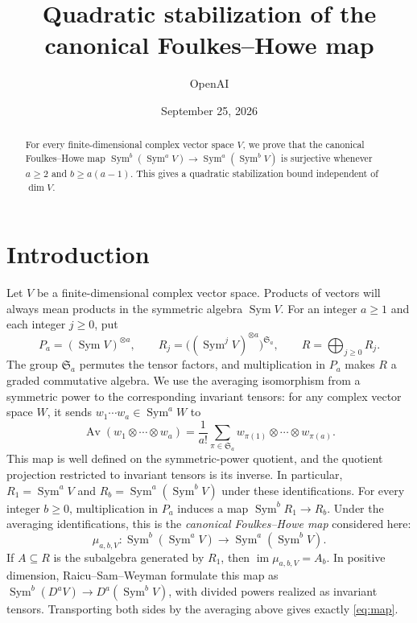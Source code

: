 \documentclass[11pt]{article}
\title{Quadratic stabilization of the canonical Foulkes--Howe map}
\author{OpenAI}
\date{September 25, 2026}
\theoremstyle{remark}
\DeclareMathOperator{\Sym}{Sym}
\DeclareMathOperator{\Av}{Av}
\newcommand{\Sa}{\mathfrak S_a}
\begin{document}
\maketitle
\begin{abstract}
For every finite-dimensional complex vector space $V$, we prove that the
canonical Foulkes--Howe map
$\Sym^b(\Sym^a V)\longrightarrow\Sym^a(\Sym^b V)$ is surjective whenever
$a\ge2$ and $b\ge a(a-1)$. This gives a quadratic stabilization bound
independent of $\dim V$.
\end{abstract}

\section{Introduction}\label{sec:introduction}

Let $V$ be a finite-dimensional complex vector space. Products of vectors
will always mean products in the symmetric algebra $\Sym V$.
For an integer $a\ge1$ and each integer $j\ge0$, put
\[
 P_a=(\Sym V)^{\otimes a},\qquad
 R_j=\bigl((\Sym^j V)^{\otimes a}\bigr)^{\Sa},\qquad
 R=\bigoplus_{j\ge0}R_j.
\]
The group $\Sa$ permutes the tensor factors, and multiplication in $P_a$
makes $R$ a graded commutative algebra. We use the averaging isomorphism
from a symmetric power to the corresponding invariant tensors: for any
complex vector space $W$, it sends $w_1\cdots w_a\in\Sym^a W$ to
\begin{equation}\label{eq:average}
 \Av(w_1\otimes\cdots\otimes w_a)
 =\frac1{a!}\sum_{\pi\in\Sa}
 w_{\pi(1)}\otimes\cdots\otimes w_{\pi(a)}.
\end{equation}
This map is well defined on the symmetric-power quotient, and the
quotient projection restricted to invariant tensors is its inverse.
In particular, $R_1=\Sym^a V$ and $R_b=\Sym^a(\Sym^b V)$ under these
identifications. For every integer $b\ge0$, multiplication in $P_a$ induces
a map $\Sym^b R_1\longrightarrow R_b$. Under the averaging identifications,
this is the \emph{canonical Foulkes--Howe map} considered here:
\begin{equation}\label{eq:map}
 \mu_{a,b,V}:\Sym^b(\Sym^a V)\longrightarrow\Sym^a(\Sym^b V).
\end{equation}
If $A\subseteq R$ is the subalgebra generated by $R_1$, then
$\operatorname{im}\mu_{a,b,V}=A_b$. In positive dimension, Raicu--Sam--Weyman
\cite[Section~2]{RSW} formulate this map as
$\Sym^b(D^aV)\longrightarrow D^a(\Sym^bV)$, with divided powers realized
as invariant tensors. Transporting both sides by the averaging above gives
exactly \eqref{eq:map}.
\end{document}
